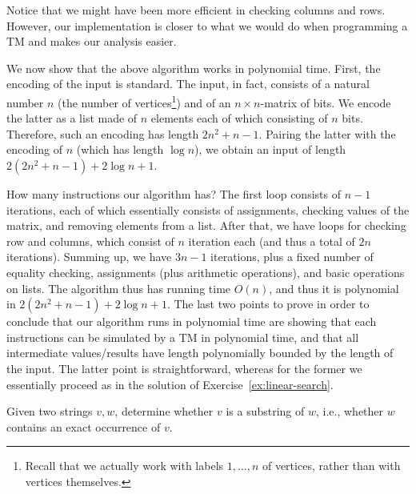 \begin{solution}
	Notice that we might have been more efficient in checking columns and rows. However, our implementation is closer to what we would do when programming a TM and makes our analysis easier.

	We now show that the above algorithm works in polynomial time. First, the encoding of the input is standard. The input, in fact, consists of a natural number $n$ (the number of vertices\footnote{Recall that we actually work with labels $1,\ldots,n$ of vertices, rather than with vertices themselves.}) and of an $n \times n$-matrix of bits. We encode the latter as a list made of $n$ elements each of which consisting of $n$ bits. Therefore, such an encoding has length $2n^2 + n - 1$. Pairing the latter with the encoding of $n$ (which has length $\log n$), we obtain an input of length $2(2n^2 + n - 1) + 2\log n + 1$.

	How many instructions our algorithm has? The first loop consists of $n-1$ iterations, each of which essentially consists of assignments, checking values of the matrix, and removing elements from a list. After that, we have loops for checking row and columns, which consist of $n$ iteration each (and thus a total of $2n$ iterations). Summing up, we have $3n - 1$ iterations, plus a fixed number of equality checking, assignments (plus arithmetic operations), and basic operations on lists. The algorithm thus has running time $O(n)$, and thus it is polynomial in $2(2n^2 + n - 1) + 2\log n + 1$.
	The last two points to prove in order to conclude that our algorithm runs in polynomial time
	are showing that each instructions can be simulated by a TM in polynomial time, and that
	all intermediate values/results have length polynomially bounded by the length of the input.
	The latter point is straightforward, whereas for the former we essentially proceed as in the solution of Exercise~\ref{ex:linear-search}.
\end{solution}

\begin{ex}[FP function]
	Given two strings $v,w$, determine whether $v$ is a substring of $w$, i.e., whether $w$ contains an exact occurrence of $v$.
\end{ex}

